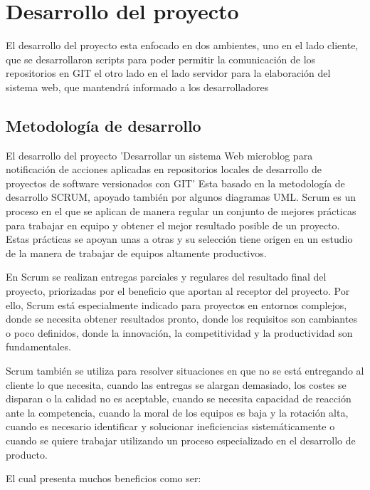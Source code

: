 

%
\chapter{Desarrollo del proyecto}
El desarrollo del proyecto esta enfocado en dos ambientes, uno en el lado cliente, que se desarrollaron scripts para poder permitir la comunicación de los repositorios en GIT
el otro lado en el lado servidor para la elaboración del sistema web, que mantendrá informado a los desarrolladores
\section{Metodología de desarrollo}
El desarrollo del proyecto 'Desarrollar un sistema Web microblog para notificación de acciones aplicadas en repositorios locales de desarrollo de proyectos de software versionados con GIT' Esta basado en la metodología de desarrollo SCRUM, apoyado también por algunos diagramas UML.
Scrum es un proceso en el que se aplican de manera regular un conjunto de mejores prácticas para trabajar en equipo y obtener el mejor resultado posible de un proyecto. Estas prácticas se apoyan unas a otras y su selección tiene origen en un estudio de la manera de trabajar de equipos altamente productivos.

En Scrum se realizan entregas parciales y regulares del resultado final del proyecto, priorizadas por el beneficio que aportan al receptor del proyecto. Por ello, Scrum está especialmente indicado para proyectos en entornos complejos, donde se necesita obtener resultados pronto, donde los requisitos son cambiantes o poco definidos, donde la innovación, la competitividad y la productividad son fundamentales.

Scrum también se utiliza para resolver situaciones en que no se está entregando al cliente lo que necesita, cuando las entregas se alargan demasiado, los costes se disparan o la calidad no es aceptable, cuando se necesita capacidad de reacción ante la competencia, cuando la moral de los equipos es baja y la rotación alta, cuando es necesario identificar y solucionar ineficiencias sistemáticamente o cuando se quiere trabajar utilizando un proceso especializado en el desarrollo de producto.

El cual presenta muchos beneficios como ser:


%
